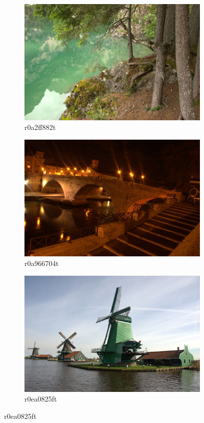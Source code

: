 \documentclass{ipol}
\begin{document}
\begin{figure}[ht]
    \begin{subfigure}[c]{.31\linewidth}\centering
    \includegraphics[width=\linewidth]{images/original/r0e04cc91t.jpeg}
    \caption{r0a2ff882t}
    \end{subfigure}\hfill%
    \begin{subfigure}[c]{.31\linewidth}\centering
    \includegraphics[width=\linewidth]{images/original/r0ea0825ft.jpeg}
    \caption{r0a966704t}
    \end{subfigure}\hfill%
    \begin{subfigure}[c]{.31\linewidth}\centering
    \includegraphics[width=\linewidth]{images/original/r1a0f5585t.jpeg}
    \caption{r0ea0825ft}
    \end{subfigure}
    

\end{figure}
\end{document}
